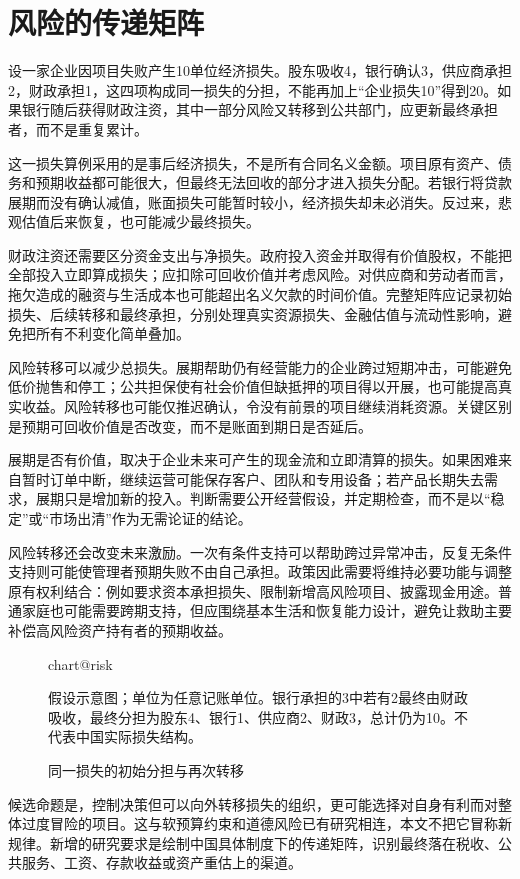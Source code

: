 \documentclass[UTF8,fontset=fandol,zihao=-4,oneside,openany]{ctexbook}
\makeatletter
\newcommand{\Chart}[3]{\begin{figure}[htbp]\centering\csname chart@#1\endcsname\caption{#2}\par\small #3\end{figure}}
\makeatother
\begin{document}
\section{风险的传递矩阵}
设一家企业因项目失败产生10单位经济损失。股东吸收4，银行确认3，供应商承担2，财政承担1，这四项构成同一损失的分担，不能再加上“企业损失10”得到20。如果银行随后获得财政注资，其中一部分风险又转移到公共部门，应更新最终承担者，而不是重复累计。

\label{arg:P110}
这一损失算例采用的是事后经济损失，不是所有合同名义金额。项目原有资产、债务和预期收益都可能很大，但最终无法回收的部分才进入损失分配。若银行将贷款展期而没有确认减值，账面损失可能暂时较小，经济损失却未必消失。反过来，悲观估值后来恢复，也可能减少最终损失。

财政注资还需要区分资金支出与净损失。政府投入资金并取得有价值股权，不能把全部投入立即算成损失；应扣除可回收价值并考虑风险。对供应商和劳动者而言，拖欠造成的融资与生活成本也可能超出名义欠款的时间价值。完整矩阵应记录初始损失、后续转移和最终承担，分别处理真实资源损失、金融估值与流动性影响，避免把所有不利变化简单叠加。

风险转移可以减少总损失。展期帮助仍有经营能力的企业跨过短期冲击，可能避免低价抛售和停工；公共担保使有社会价值但缺抵押的项目得以开展，也可能提高真实收益。风险转移也可能仅推迟确认，令没有前景的项目继续消耗资源。关键区别是预期可回收价值是否改变，而不是账面到期日是否延后。

\label{arg:P111}
展期是否有价值，取决于企业未来可产生的现金流和立即清算的损失。如果困难来自暂时订单中断，继续运营可能保存客户、团队和专用设备；若产品长期失去需求，展期只是增加新的投入。判断需要公开经营假设，并定期检查，而不是以“稳定”或“市场出清”作为无需论证的结论。

风险转移还会改变未来激励。一次有条件支持可以帮助跨过异常冲击，反复无条件支持则可能使管理者预期失败不由自己承担。政策因此需要将维持必要功能与调整原有权利结合：例如要求资本承担损失、限制新增高风险项目、披露现金用途。普通家庭也可能需要跨期支持，但应围绕基本生活和恢复能力设计，避免让救助主要补偿高风险资产持有者的预期收益。

\Chart{risk}{同一损失的初始分担与再次转移}{假设示意图；单位为任意记账单位。银行承担的3中若有2最终由财政吸收，最终分担为股东4、银行1、供应商2、财政3，总计仍为10。不代表中国实际损失结构。}

候选命题是，控制决策但可以向外转移损失的组织，更可能选择对自身有利而对整体过度冒险的项目。这与软预算约束和道德风险已有研究相连，本文不把它冒称新规律。新增的研究要求是绘制中国具体制度下的传递矩阵，识别最终落在税收、公共服务、工资、存款收益或资产重估上的渠道。
\end{document}
